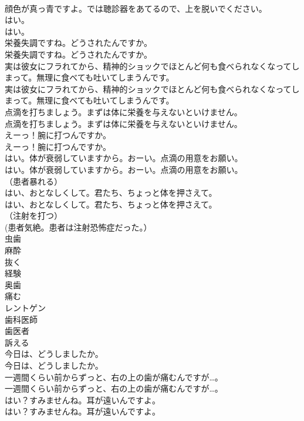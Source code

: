 \documentclass[8pt]{extreport}
\begin{document}
\begin{CJK}{UTF8}{min}
\\	顔色が真っ青ですよ。では聴診器をあてるので、上を脱いでください。 
\\	はい。	
\\	はい。 
\\	栄養失調ですね。どうされたんですか。	
\\	栄養失調ですね。どうされたんですか。 
\\	実は彼女にフラれてから、精神的ショックでほとんど何も食べられなくなってしまって。無理に食べても吐いてしまうんです。	
\\	実は彼女にフラれてから、精神的ショックでほとんど何も食べられなくなってしまって。無理に食べても吐いてしまうんです。 
\\	点滴を打ちましょう。まずは体に栄養を与えないといけません。	
\\	点滴を打ちましょう。まずは体に栄養を与えないといけません。 
\\	えーっ！腕に打つんですか。	
\\	えーっ！腕に打つんですか。 
\\	はい。体が衰弱していますから。おーい。点滴の用意をお願い。	
\\	はい。体が衰弱していますから。おーい。点滴の用意をお願い。 
\\	（患者暴れる）	
\\	はい、おとなしくして。君たち、ちょっと体を押さえて。	
\\	はい、おとなしくして。君たち、ちょっと体を押さえて。 
\\	（注射を打つ）	
\\	(患者気絶。患者は注射恐怖症だった。）	
\\	虫歯
\\	麻酔
\\	抜く
\\	経験
\\	奥歯
\\	痛む
\\	レントゲン
\\	歯科医師
\\	歯医者
\\	訴える
\\	今日は、どうしましたか。	
\\	今日は、どうしましたか。 
\\	一週間くらい前からずっと、右の上の歯が痛むんですが…。	
\\	一週間くらい前からずっと、右の上の歯が痛むんですが…。 
\\	はい？すみませんね。耳が遠いんですよ。	
\\	はい？すみませんね。耳が遠いんですよ。 

\end{CJK}
\end{document}
